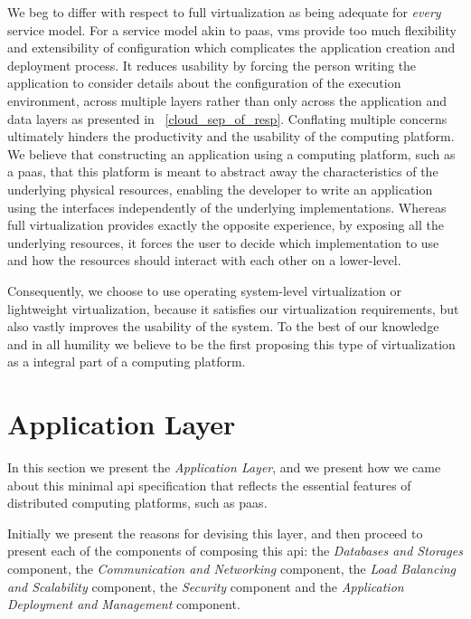 \documentclass[12pt, titlepage]{uo_temp}
\begin{document}
     We beg to differ with respect to full virtualization as being adequate for
     \emph{every} service model. For a service model akin to \gls{paas}, \gls{vm}s provide
     too much flexibility and extensibility of configuration which complicates the
     application creation and deployment process. It reduces usability by forcing the
     person writing the application to consider details about the configuration of the
     execution environment, across multiple layers rather than only across the application
     and data layers as presented in ~\ref{cloud_sep_of_resp}. Conflating multiple
     concerns ultimately hinders the productivity and the usability of the computing
     platform. We believe that constructing an application using a computing platform,
     such as a \gls{paas}, that this platform is meant to abstract away the
     characteristics of the underlying physical resources, enabling the developer to write
     an application using the interfaces independently of the underlying
     implementations. Whereas full virtualization provides exactly the opposite
     experience, by exposing all the underlying resources, it forces the user to decide
     which implementation to use and how the resources should interact with each other on
     a lower-level.

     Consequently, we choose to use operating system-level virtualization or lightweight
     virtualization, because it satisfies our virtualization requirements, but also vastly
     improves the usability of the system. To the best of our knowledge and in all
     humility we believe to be the first proposing this type of virtualization as a
     integral part of a computing platform.

     \section{Application Layer}
     In this section we present the \emph{Application Layer}, and we present how we came
     about this minimal \gls{api} specification that reflects the essential features of
     distributed computing platforms, such as \gls{paas}.

     Initially we present the reasons for devising this layer, and then proceed to present
     each of the components of composing this \gls{api}: the \emph{Databases and Storages}
     component, the \emph{Communication and Networking} component, the \emph{Load
       Balancing and Scalability} component, the \emph{Security} component and the
     \emph{Application Deployment and Management} component.
\end{document}
